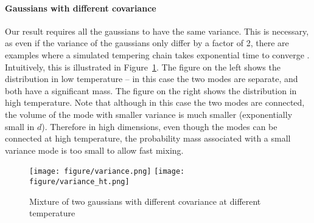 
\paragraph{Gaussians with different covariance} Our result requires all the gaussians to have the same variance. This is necessary, as even if the variance of the gaussians only differ by a factor of 2, there are examples where a simulated tempering chain takes exponential time to converge \cite{woodard2009sufficient}. Intuitively, this is illustrated in Figure~\ref{figure:variance}. The figure on the left shows the distribution in low temperature \--- in this case the two modes are separate, and both have a significant mass. The figure on the right shows the distribution in high temperature. Note that although in this case the two modes are connected, the volume of the mode with smaller variance is much smaller (exponentially small in $d$). Therefore in high dimensions, even though the modes can be connected at high temperature, the probability mass associated with a small variance mode is too small to allow fast mixing.

\begin{figure}[h!]
\centering
\texttt{[image: figure/variance.png]}
\texttt{[image: figure/variance\_ht.png]}
\caption{Mixture of two gaussians with different covariance at different temperature}
\label{figure:variance}
\end{figure}


